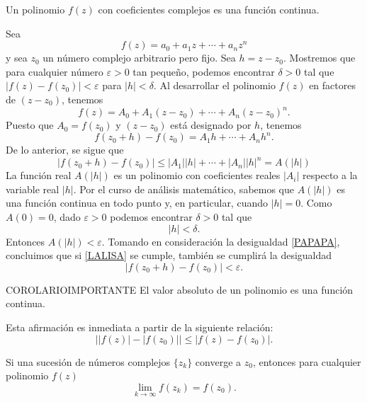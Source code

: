 \begin{lemma}{}{}
    Un polinomio $f(z)$ con coeficientes complejos es una función continua.

    \tcblower
    \demostracion Sea
    $$f(z) = a_0+a_1z+ \cdots + a_nz^n$$
    y sea $z_0$ un número complejo arbitrario pero fijo. Sea $h=z-z_0$. Mostremos que para cualquier número $\varepsilon >0$ tan pequeño, podemos encontrar $\delta >0$ tal que $|f(z)-f(z_0)|<\varepsilon$ para $|h|<\delta$. Al desarrollar el polinomio $f(z)$ en factores de $(z-z_0)$, tenemos
    $$f(z)=A_0+A_1(z-z_0)+\cdots + A_n(z-z_0)^n.$$
    Puesto que $A_0=f(z_0)$ y $(z-z_0)$ está designado por $h$, tenemos
    $$f(z_0+h)-f(z_0)=A_1h+\cdots +A_nh^n.$$
    De lo anterior, se sigue que
    \begin{equation}
        |f(z_0+h)-f(z_0)| \leq |A_1||h|+ \cdots +|A_n||h|^n=A(|h|) \label{PAPAPA}
    \end{equation}
    La función real $A(|h|)$ es un polinomio con coeficientes reales $|A_i|$ respecto a la variable real $|h|$. Por el curso de análisis matemático, sabemos que $A(|h|)$ es una función continua en todo punto y, en particular, cuando $|h|=0$. Como $A(0)=0$, dado $\varepsilon >0$ podemos encontrar $\delta >0$ tal que
    \begin{equation}
        |h|<\delta. \label{LALISA}
    \end{equation}
    Entonces $A(|h|)<\varepsilon$. Tomando en consideración la desigualdad \eqref{PAPAPA}, concluimos que si \eqref{LALISA} se cumple, también se cumplirá la desigualdad
    $$|f(z_0+h)-f(z_0)|<\varepsilon.$$
\end{lemma}

\begin{corollary}{}{COROLARIOIMPORTANTE}
    El valor absoluto de un polinomio es una función continua.

    \tcblower
    \demostracion Esta afirmación es inmediata a partir de la siguiente relación:
    $$\big| |f(z)|-|f(z_0)| \big| \leq |f(z)-f(z_0)|.$$
\end{corollary}

\begin{corollary}{}{}
    Si una sucesión de números complejos $\{z_k\}$ converge a $z_0$, entonces para cualquier polinomio $f(z)$
    $$\lim_{k \rightarrow \infty} f(z_k)=f(z_0).$$
\end{corollary}

